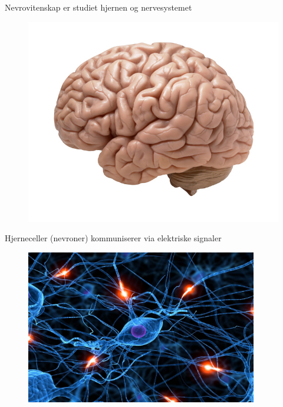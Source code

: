 \documentclass[presentation]{beamer}
\begin{document}
\begin{frame}{Nevrovitenskap er studiet hjernen og nervesystemet}
   \begin{figure}
       {\includegraphics[width=1\textwidth]{brain.jpg}}
\end{figure}
\end{frame}

\begin{frame}{Hjerneceller (nevroner) kommuniserer via elektriske signaler}
   \begin{figure}
       {\includegraphics[width=0.9\textwidth]{network.jpeg}}
\end{figure}
\end{frame}
\end{document}
